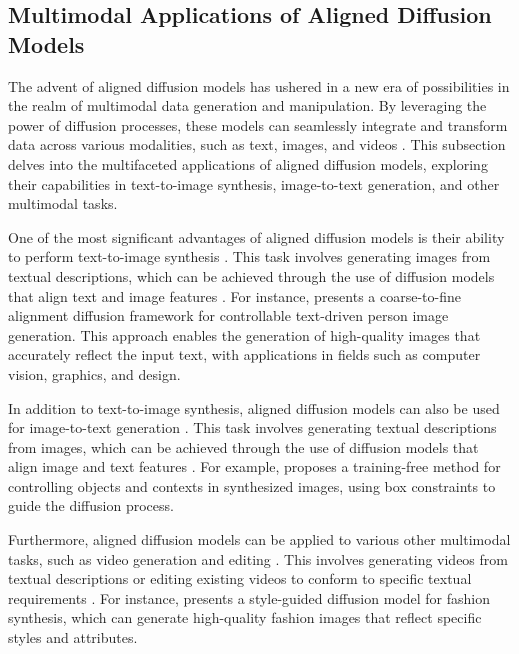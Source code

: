 \documentclass[11pt,a4paper]{article}
\begin{document}
\subsection{Multimodal Applications of Aligned Diffusion Models}


The advent of aligned diffusion models has ushered in a new era of possibilities in the realm of multimodal data generation and manipulation. By leveraging the power of diffusion processes, these models can seamlessly integrate and transform data across various modalities, such as text, images, and videos \cite{doi:10.1145/3626235}. This subsection delves into the multifaceted applications of aligned diffusion models, exploring their capabilities in text-to-image synthesis, image-to-text generation, and other multimodal tasks.

One of the most significant advantages of aligned diffusion models is their ability to perform text-to-image synthesis \cite{doi:10.1109/cvpr52729.2023.02154}. This task involves generating images from textual descriptions, which can be achieved through the use of diffusion models that align text and image features \cite{arxiv:2404.03653}. For instance, \cite{arxiv:2211.06235} presents a coarse-to-fine alignment diffusion framework for controllable text-driven person image generation. This approach enables the generation of high-quality images that accurately reflect the input text, with applications in fields such as computer vision, graphics, and design.

In addition to text-to-image synthesis, aligned diffusion models can also be used for image-to-text generation \cite{doi:10.18653/v1/d19-1136}. This task involves generating textual descriptions from images, which can be achieved through the use of diffusion models that align image and text features \cite{doi:10.18653/v1/2021.acl-long.369}. For example, \cite{doi:10.1109/iccv51070.2023.00685} proposes a training-free method for controlling objects and contexts in synthesized images, using box constraints to guide the diffusion process.

Furthermore, aligned diffusion models can be applied to various other multimodal tasks, such as video generation and editing \cite{doi:10.1145/3680528.3687621}. This involves generating videos from textual descriptions or editing existing videos to conform to specific textual requirements \cite{arxiv:2307.02421}. For instance, \cite{doi:10.1145/3581783.3613806} presents a style-guided diffusion model for fashion synthesis, which can generate high-quality fashion images that reflect specific styles and attributes.
\end{document}
